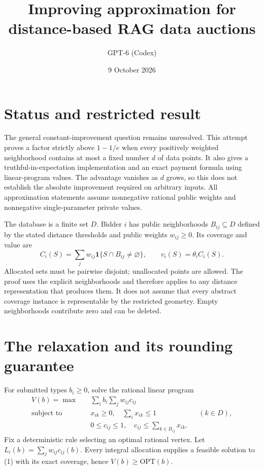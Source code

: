 \documentclass[11pt]{article}
\title{Improving approximation for distance-based RAG data auctions}
\author{GPT-6 (Codex)}
\date{9 October 2026}
\newcommand{\ind}{\mathbf 1}
\begin{document}
\maketitle
\section*{Status and restricted result}
The general constant-improvement question remains unresolved. This attempt
proves a factor strictly above $1-1/e$ when every positively weighted
neighborhood contains at most a fixed number $d$ of data points. It also
gives a truthful-in-expectation implementation and an exact payment formula
using linear-program values. The advantage vanishes as $d$ grows, so this
does not establish the absolute improvement required on arbitrary inputs.
All approximation statements assume nonnegative rational public weights
and nonnegative single-parameter private values.

The database is a finite set $D$. Bidder $i$ has public neighborhoods
$B_{ij}\subseteq D$ defined by the stated distance thresholds and public
weights $w_{ij}\geq0$. Its coverage and value are
\[
 C_i(S)=\sum_j w_{ij}\ind\{S\cap B_{ij}\ne\varnothing\},
 \qquad v_i(S)=\theta_i C_i(S).
\]
Allocated sets must be pairwise disjoint; unallocated points are allowed.
The proof uses the explicit neighborhoods and therefore applies to any
distance representation that produces them. It does not assume that every
abstract coverage instance is representable by the restricted geometry.
Empty neighborhoods contribute zero and can be deleted.

\section*{The relaxation and its rounding guarantee}
For submitted types $b_i\geq0$, solve the rational linear program
\[
 \begin{aligned}
 V(b)=\max\quad&\sum_i b_i\sum_j w_{ij}c_{ij}\\
 \text{subject to}\quad&x_{ik}\geq0,\quad \sum_i x_{ik}\leq1
                                      &&(k\in D),\\
 &0\leq c_{ij}\leq1,\quad c_{ij}\leq\sum_{k\in B_{ij}}x_{ik}.
 \end{aligned}                                                   \tag{1}
\]
Fix a deterministic rule selecting an optimal rational vertex. Let
$L_i(b)=\sum_jw_{ij}c_{ij}(b)$. Every integral allocation supplies a feasible
solution to (1) with its exact coverage, hence $V(b)\geq\mathrm{OPT}(b)$.
\end{document}
